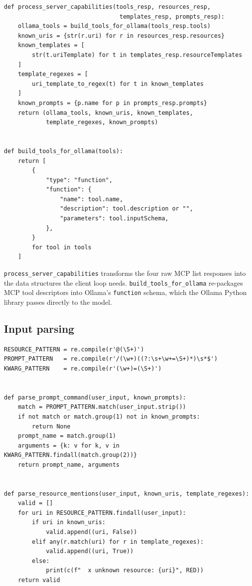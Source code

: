 \documentclass[11pt, a4paper]{article}
\begin{document}
\begin{lstlisting}[caption={process\_server\_capabilities and build\_tools\_for\_ollama}]
def process_server_capabilities(tools_resp, resources_resp,
                                 templates_resp, prompts_resp):
    ollama_tools = build_tools_for_ollama(tools_resp.tools)
    known_uris = {str(r.uri) for r in resources_resp.resources}
    known_templates = [
        str(t.uriTemplate) for t in templates_resp.resourceTemplates
    ]
    template_regexes = [
        uri_template_to_regex(t) for t in known_templates
    ]
    known_prompts = {p.name for p in prompts_resp.prompts}
    return (ollama_tools, known_uris, known_templates,
            template_regexes, known_prompts)


def build_tools_for_ollama(tools):
    return [
        {
            "type": "function",
            "function": {
                "name": tool.name,
                "description": tool.description or "",
                "parameters": tool.inputSchema,
            },
        }
        for tool in tools
    ]
\end{lstlisting}

\texttt{process\_server\_capabilities} transforms the four raw MCP list responses into the data structures the client loop needs. \texttt{build\_tools\_for\_ollama} re-packages MCP tool descriptors into Ollama's \texttt{function} schema, which the Ollama Python library passes directly to the model.

\subsection{Input parsing}

\begin{lstlisting}[caption={Regex patterns and parsers}]
RESOURCE_PATTERN = re.compile(r'@(\S+)')
PROMPT_PATTERN   = re.compile(r'/(\w+)((?:\s+\w+=\S+)*)\s*$')
KWARG_PATTERN    = re.compile(r'(\w+)=(\S+)')


def parse_prompt_command(user_input, known_prompts):
    match = PROMPT_PATTERN.match(user_input.strip())
    if not match or match.group(1) not in known_prompts:
        return None
    prompt_name = match.group(1)
    arguments = {k: v for k, v in KWARG_PATTERN.findall(match.group(2))}
    return prompt_name, arguments


def parse_resource_mentions(user_input, known_uris, template_regexes):
    valid = []
    for uri in RESOURCE_PATTERN.findall(user_input):
        if uri in known_uris:
            valid.append((uri, False))
        elif any(r.match(uri) for r in template_regexes):
            valid.append((uri, True))
        else:
            print(c(f"  x unknown resource: {uri}", RED))
    return valid
\end{lstlisting}
\end{document}
